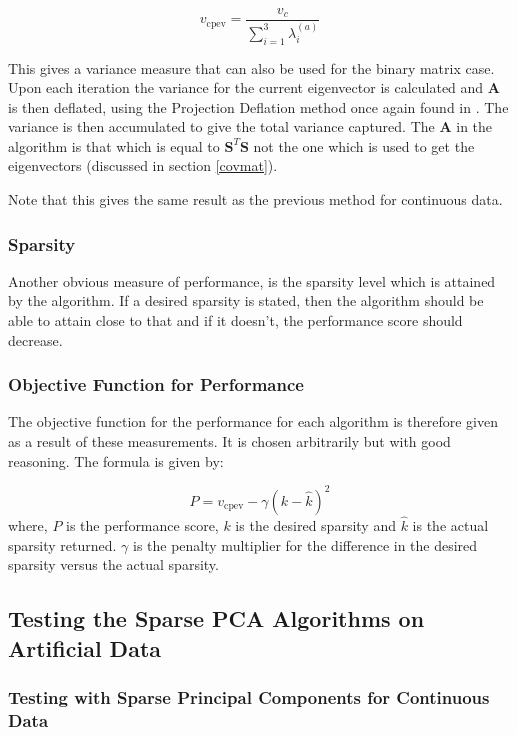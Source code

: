 \documentclass[11pt,a4paper]{article}
\newcommand{\smat}{\mathbf{S}}
\newcommand{\covmat}{\mathbf{A}}
\newcommand{\tp}{^T}
\begin{document}
\begin{equation*}
v_\text{cpev} = \frac{v_c}{\sum_{i=1}^3\lambda^{(a)}_i}
\end{equation*}

This gives a variance measure that can also be used for the binary matrix case. Upon each iteration the variance for the current eigenvector is calculated and $\covmat$ is then deflated, using the Projection Deflation method once again found in \cite{Mackey_deflationmethods}. The variance is then accumulated to give the total variance captured. The $\covmat$ in the algorithm is that which is equal to $\smat\tp\smat$ not the one which is used to get the eigenvectors (discussed in section \ref{covmat}).

Note that this gives the same result as the previous method for continuous data. 
\subsubsection{Sparsity}
Another obvious measure of performance, is the sparsity level which is attained by the algorithm. If a desired sparsity is stated, then the algorithm should be able to attain close to that and if it doesn't, the performance score should decrease. 

\subsubsection{Objective Function for Performance}
The objective function for the performance for each algorithm is therefore given as a result of these measurements. It is chosen arbitrarily but with good reasoning. The formula is given by:

\begin{equation}
P = v_\text{cpev} - \gamma \left(k - \hat{k}\right)^2
\label{obj_function}
\end{equation}
where, $P$ is the performance score, $k$ is the desired sparsity and $\hat{k}$ is the actual sparsity returned. $\gamma$ is the penalty multiplier for the difference in the desired sparsity versus the actual sparsity.







\subsection{Testing the Sparse PCA Algorithms on Artificial Data}\label{testing}
\subsubsection{Testing with Sparse Principal Components for Continuous Data}

\end{document}
